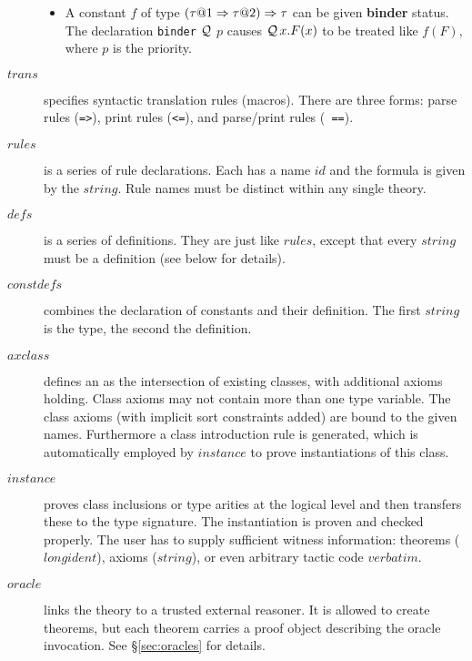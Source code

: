 \begin{description}
\begin{itemize}
  \item A constant $f$ of type $(\tau@1\To\tau@2)\To\tau$ can be given {\bf
    binder} status.  The declaration {\tt binder} $\cal Q$ $p$ causes
  ${\cal Q}\,x.F(x)$ to be treated
  like $f(F)$, where $p$ is the priority.
  \end{itemize}

\item[$trans$]
  specifies syntactic translation rules (macros).  There are three forms:
  parse rules ({\tt =>}), print rules ({\tt <=}), and parse/print rules ({\tt
  ==}).

\item[$rules$]
  is a series of rule declarations.  Each has a name $id$ and the formula is
  given by the $string$.  Rule names must be distinct within any single
  theory.

\item[$defs$] is a series of definitions.  They are just like $rules$, except
  that every $string$ must be a definition (see below for details).

\item[$constdefs$] combines the declaration of constants and their
  definition.  The first $string$ is the type, the second the definition.
  
\item[$axclass$]  defines an  \cite{Wenzel:1997:TPHOL} as the intersection of existing classes,
  with additional axioms holding.  Class axioms may not contain more than one
  type variable.  The class axioms (with implicit sort constraints added) are
  bound to the given names.  Furthermore a class introduction rule is
  generated, which is automatically employed by $instance$ to prove
  instantiations of this class.
  
\item[$instance$]  proves class inclusions or
  type arities at the logical level and then transfers these to the
  type signature.  The instantiation is proven and checked properly.
  The user has to supply sufficient witness information: theorems
  ($longident$), axioms ($string$), or even arbitrary \ML{} tactic
  code $verbatim$.

\item[$oracle$] links the theory to a trusted external reasoner.  It is
  allowed to create theorems, but each theorem carries a proof object
  describing the oracle invocation.  See \S\ref{sec:oracles} for details.
  

\end{description}
